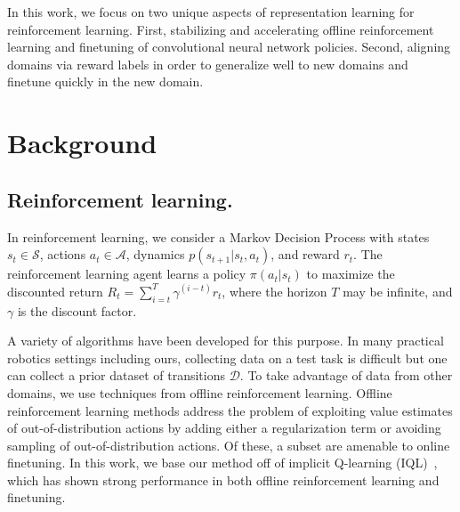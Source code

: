 \documentclass[letterpaper, 10 pt, conference, final]{ieeeconf}   %
\begin{document}
In this work, we focus on two unique aspects of representation learning for reinforcement learning. First, stabilizing and accelerating offline reinforcement learning and finetuning of convolutional neural network policies. Second, aligning domains via reward labels in order to generalize well to new domains and finetune quickly in the new domain.

\section{Background}

\subsection{Reinforcement learning.}

In reinforcement learning, we consider a Markov Decision Process with states $s_t \in \mathcal{S}$, actions $a_t \in \mathcal{A}$, dynamics $p(s_{t+1}|s_t, a_t)$, and reward $r_t$. The reinforcement learning agent learns a policy $\pi(a_t|s_t)$ to maximize the discounted return $R_t = \sum_{i=t}^T \gamma^(i-t) r_t$, where the horizon $T$ may be infinite, and $\gamma$ is the discount factor.

A variety of algorithms have been developed for this purpose. In many practical robotics settings including ours, collecting data on a test task is difficult but one can collect a prior dataset of transitions $\mathcal{D}$. To take advantage of data from other domains, we use techniques from offline reinforcement learning. Offline reinforcement learning methods address the problem of exploiting value estimates of out-of-distribution actions by adding either a regularization term or avoiding sampling of out-of-distribution actions. Of these, a subset are amenable to online finetuning. In this work, we base our method off of implicit Q-learning (IQL)~\cite{kostrikov2021iql}, which has shown strong performance in both offline reinforcement learning and finetuning.
\end{document}
